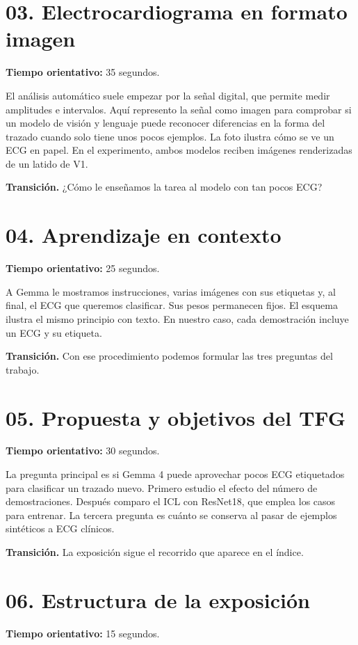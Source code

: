 \documentclass[11pt,a4paper]{article}
\begin{document}
\section*{03. Electrocardiograma en formato imagen}
\textbf{Tiempo orientativo: }35 segundos.

El análisis automático suele empezar por la señal digital, que permite medir amplitudes e intervalos. Aquí represento la señal como imagen para comprobar si un modelo de visión y lenguaje puede reconocer diferencias en la forma del trazado cuando solo tiene unos pocos ejemplos. La foto ilustra cómo se ve un ECG en papel. En el experimento, ambos modelos reciben imágenes renderizadas de un latido de V1.

\textbf{Transición.} ¿Cómo le enseñamos la tarea al modelo con tan pocos ECG?

\section*{04. Aprendizaje en contexto}
\textbf{Tiempo orientativo: }25 segundos.

A Gemma le mostramos instrucciones, varias imágenes con sus etiquetas y, al final, el ECG que queremos clasificar. Sus pesos permanecen fijos. El esquema ilustra el mismo principio con texto. En nuestro caso, cada demostración incluye un ECG y su etiqueta.

\textbf{Transición.} Con ese procedimiento podemos formular las tres preguntas del trabajo.

\section*{05. Propuesta y objetivos del TFG}
\textbf{Tiempo orientativo: }30 segundos.

La pregunta principal es si Gemma 4 puede aprovechar pocos ECG etiquetados para clasificar un trazado nuevo. Primero estudio el efecto del número de demostraciones. Después comparo el ICL con ResNet18, que emplea los casos para entrenar. La tercera pregunta es cuánto se conserva al pasar de ejemplos sintéticos a ECG clínicos.

\textbf{Transición.} La exposición sigue el recorrido que aparece en el índice.

\section*{06. Estructura de la exposición}
\textbf{Tiempo orientativo: }15 segundos.
\end{document}

